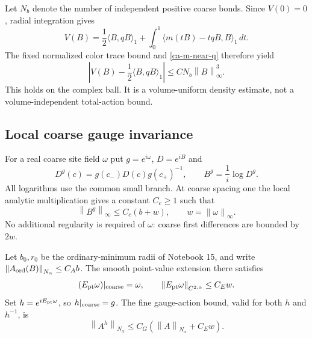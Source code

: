 \documentclass[11pt]{article}
\theoremstyle{remark}
\newcommand{\norm}[1]{\left\|#1\right\|}
\begin{document}
Let $N_b$ denote the number of independent positive coarse
bonds. Since $V(0)=0$, radial integration gives
\begin{equation}\label{ca-radial}
 V(B)=\frac12\langle B,qB\rangle_1
       +\int_0^1\langle m(tB)-tqB,B\rangle_1\,dt.
\end{equation}
The fixed normalized color trace bound and
\eqref{ca-m-near-q} therefore yield
\begin{equation}\label{ca-cubic-remainder}
 \boxed{\quad
 \left|V(B)-\frac12\langle B,qB\rangle_1\right|
          \le C N_b\norm{B}_\infty^3.
 \quad}
\end{equation}
This holds on the complex ball. It is a volume-uniform
density estimate, not a volume-independent total-action bound.

\subsection{Local coarse gauge invariance}
\label{ca-gauge-section}

For a real coarse site field $\omega$ put $g=e^{i\omega}$,
$D=e^{iB}$ and
\begin{equation}\label{ca-coarse-gauge}
 D^g(c)=g(c_-)D(c)g(c_+)^{-1},\qquad
 B^g=\frac1i\log D^g.
\end{equation}
All logarithms use the common small branch. At coarse spacing
one the local analytic multiplication gives a constant
$C_c\ge1$ such that
\begin{equation}\label{ca-coarse-gauge-bound}
 \norm{B^g}_\infty\le C_c(b+w),\qquad
 w=\norm{\omega}_\infty.
\end{equation}
No additional regularity is required of $\omega$: coarse
first differences are bounded by $2w$.

Let $b_0,r_0$ be the ordinary-minimum radii of Notebook 15,
and write
$\norm{A_{\rm ord}(B)}_{N_\alpha}\le C_Ab$.
The smooth point-value extension there satisfies
\begin{equation}\label{ca-smooth-gauge-lift}
 (E_{\rm pt}\omega)|_{\rm coarse}=\omega,\qquad
 \norm{E_{\rm pt}\omega}_{C^{2,\alpha}}\le C_Ew.
\end{equation}
Set $h=e^{iE_{\rm pt}\omega}$, so $h|_{\rm coarse}=g$.
The fine gauge-action bound, valid for both $h$ and $h^{-1}$,
is
\begin{equation}\label{ca-fine-gauge-bound}
 \norm{A^h}_{N_\alpha}
       \le C_G(\norm A_{N_\alpha}+C_Ew).
\end{equation}
\end{document}
